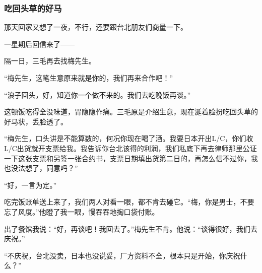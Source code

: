 \subsubsection*{吃回头草的好马}
\par 那天回家又想了一夜，不行，还要跟台北朋友们商量一下。
\par 一星期后回信来了——
\par 隔一日，三毛再去找梅先生。
\par “梅先生，这笔生意原来就是你的，我们再来合作吧！”
\par “浪子回头，好，知道你一个做不来的。我们去吃晚饭再谈。”
\par 这顿饭吃得全没味道，胃隐隐作痛。三毛原是介绍生意，现在涎着脸扮吃回头草的好马状，丢脸透了。
\par “梅先生，口头讲是不能算数的，何况你现在喝了酒。我要日本开出L/C，你们收L/C出货就开支票给我。我告诉你台北该得的利润，我们私底下再去律师那里公证一下这张支票和另签一张合约书，支票日期填出货第二日的，再怎么信不过你，我也没法想了，同意吗？”
\par “好，一言为定。”
\par 吃完饭账单送上来了，我们两人对看一眼，都不肯去碰它。“梅，你是男士，不要忘了风度。”他瞪了我一眼，慢吞吞地掏口袋付账。
\par 出了餐馆我说：“好，再谈吧！我回去了。”梅先生不肯。他说：“谈得很好，我们去庆祝。”
\par “不庆祝，台北没卖，日本也没说妥，厂方资料不全，根本只是开始，你庆祝什么？”
